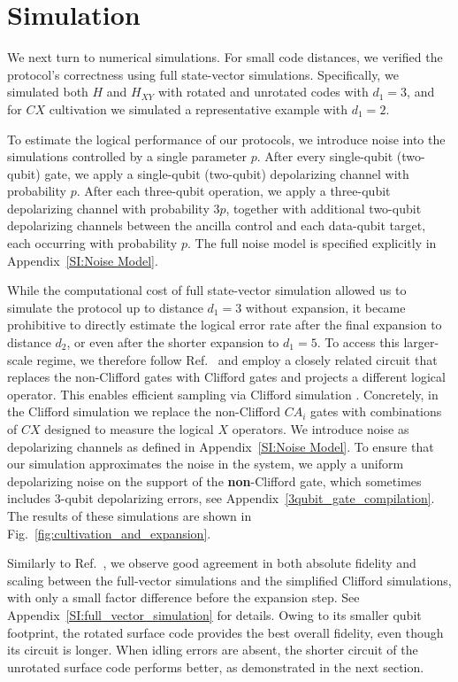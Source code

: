\documentclass[twocolumn,notitlepage,nofootinbib,floatfix,superscriptaddress]{revtex4-1}
\begin{document}
\section{Simulation}

We next turn to numerical simulations. For small code distances, we verified the protocol’s correctness using full state-vector simulations. Specifically, we simulated both $H$ and $H_{XY}$ with rotated and unrotated codes with $d_1=3$, and for $CX$ cultivation we simulated a representative example with $d_1=2$. 

To estimate the logical performance of our protocols, we introduce noise into the simulations controlled by a single parameter $p$. After every single-qubit (two-qubit) gate, we apply a single-qubit (two-qubit) depolarizing channel with probability $p$. After each three-qubit operation, we apply a three-qubit depolarizing channel with probability $3p$, together with additional two-qubit depolarizing channels between the ancilla control and each data-qubit target, each occurring with probability $p$. The full noise model is specified explicitly in Appendix~\ref{SI:Noise Model}. 

While the computational cost of full state-vector simulation allowed us to simulate the protocol up to distance $d_1 = 3$ without expansion, it became prohibitive to directly estimate the logical error rate after the final expansion to distance $d_2$, or even after the shorter expansion to $d_1 = 5$. To access this larger-scale regime, we therefore follow Ref.~\cite{gidney2024magic} and employ a closely related circuit that replaces the non-Clifford gates with Clifford gates and projects a different logical operator. This enables efficient sampling via Clifford simulation \cite{gottesman1998heisenberg, aaronson2004improved,gidney2021stim, gidney2024magic}. Concretely, in the Clifford simulation \cite{aaronson2004improved,gidney2021stim} we replace the non-Clifford $CA_i$ gates with combinations of $CX$ designed to measure the logical $X$ operators. We introduce noise as depolarizing channels as defined in Appendix~\ref{SI:Noise Model}. To ensure that our simulation approximates the noise in the system, we apply a uniform depolarizing noise on the support of the \textbf{non}-Clifford gate, which sometimes includes 3-qubit depolarizing errors, see Appendix~\ref{3qubit_gate_compilation}. The results of these simulations are shown in Fig.~\ref{fig:cultivation_and_expansion}.

Similarly to Ref.~\cite{gidney2024magic}, we observe good agreement in both absolute fidelity and scaling between the full-vector simulations and the simplified Clifford simulations, with only a small factor difference before the expansion step. See Appendix~\ref{SI:full_vector_simulation} for details. Owing to its smaller qubit footprint, the rotated surface code provides the best overall fidelity, even though its circuit is longer. When idling errors are absent, the shorter circuit of the unrotated surface code performs better, as demonstrated in the next section.
\end{document}
